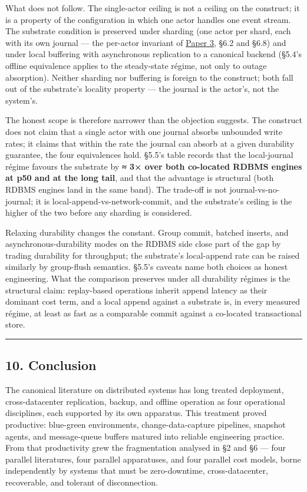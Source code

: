 \documentclass[
]{article}
\begin{document}
What does not follow. The single-actor ceiling is not a ceiling on the
construct; it is a property of the configuration in which one actor
handles one event stream. The substrate condition is preserved under
sharding (one actor per shard, each with its own journal --- the
per-actor invariant of \href{03-reactions-and-partition.md}{Paper 3},
§6.2 and §6.8) and under local buffering with asynchronous replication
to a canonical backend (§5.4's offline equivalence applies to the
steady-state régime, not only to outage absorption). Neither sharding
nor buffering is foreign to the construct; both fall out of the
substrate's locality property --- the journal is the actor's, not the
system's.

The honest scope is therefore narrower than the objection suggests. The
construct does not claim that a single actor with one journal absorbs
unbounded write rates; it claims that within the rate the journal can
absorb at a given durability guarantee, the four equivalences hold.
§5.5's table records that the local-journal régime favours the substrate
by \textbf{≈ 3× over both co-located RDBMS engines at p50 and at the
long tail}, and that the advantage is structural (both RDBMS engines
land in the same band). The trade-off is not journal-vs-no-journal; it
is local-append-vs-network-commit, and the substrate's ceiling is the
higher of the two before any sharding is considered.

Relaxing durability changes the constant. Group commit, batched inserts,
and asynchronous-durability modes on the RDBMS side close part of the
gap by trading durability for throughput; the substrate's local-append
rate can be raised similarly by group-flush semantics. §5.5's caveats
name both choices as honest engineering. What the comparison preserves
under all durability régimes is the structural claim: replay-based
operations inherit append latency as their dominant cost term, and a
local append against a substrate is, in every measured régime, at least
as fast as a comparable commit against a co-located transactional store.

\begin{center}\rule{0.5\linewidth}{0.5pt}\end{center}

\subsection{10. Conclusion}\label{conclusion}

The canonical literature on distributed systems has long treated
deployment, cross-datacenter replication, backup, and offline operation
as four operational disciplines, each supported by its own apparatus.
This treatment proved productive: blue-green environments,
change-data-capture pipelines, snapshot agents, and message-queue
buffers matured into reliable engineering practice. From that
productivity grew the fragmentation analysed in §2 and §6 --- four
parallel literatures, four parallel apparatuses, and four parallel cost
models, borne independently by systems that must be zero-downtime,
cross-datacenter, recoverable, and tolerant of disconnection.
\end{document}
